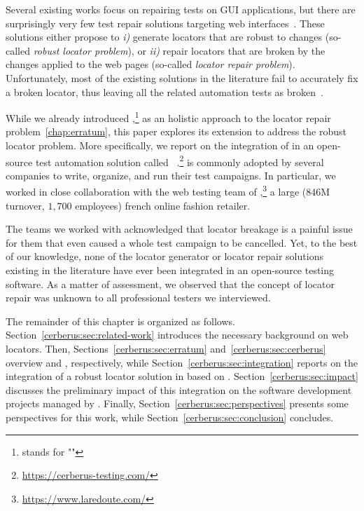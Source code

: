 Several existing works focus on repairing tests on GUI applications, but there are surprisingly very few test repair solutions targeting web interfaces~\cite{imtiaz2019systematic}.
These solutions either propose to \emph{i)} generate locators that are robust to changes (so-called \emph{robust locator problem}), or \emph{ii)} repair locators that are broken by the changes applied to the web pages (so-called \emph{locator repair problem}).
Unfortunately, most of the existing solutions in the literature fail to accurately fix a broken locator, thus leaving all the related automation tests as broken~\cite{hammoudi2016record}.

While we already introduced \erratum{},\footnote{\erratum{} stands for "\erratumlong{}"} as an holistic approach to the locator repair problem~\ref{chap:erratum}, this         paper explores its extension to address the robust locator problem.
More specifically, we report on the integration of \erratum{} in an open-source test automation solution called \cerberus{}~\cite{cerberus-icst20}.\footnote{\url{https://cerberus-testing.com/}}
\cerberus{} is commonly adopted by several companies to write, organize, and run their test campaigns.
In particular, we worked in close collaboration with the web testing team of \laredoute{},\footnote{\url{https://www.laredoute.com/}} a large (846M turnover, $1,700$ employees) french online fashion retailer.

The teams we worked with acknowledged that locator breakage is a painful issue for them that even caused a whole test campaign to be cancelled.
Yet, to the best of our knowledge, none of the locator generator or locator repair solutions existing in the literature have ever been integrated in an open-source testing software.
As a matter of assessment, we observed that the concept of locator repair was unknown to all professional testers we interviewed.


The remainder of this chapter is organized as follows.
Section~\ref{cerberus:sec:related-work} introduces the necessary background on web locators.
% 
Then, Sections~\ref{cerberus:sec:erratum} and~\ref{cerberus:sec:cerberus} overview \erratum and \cerberus, respectively, while Section~\ref{cerberus:sec:integration} reports on the integration of a robust locator solution in \cerberus based on \erratum.
Section~\ref{cerberus:sec:impact} discusses the preliminary impact of this integration on the software development projects managed by \laredoute.
% 
Finally, Section~\ref{cerberus:sec:perspectives} presents some perspectives for this work, while Section~\ref{cerberus:sec:conclusion} concludes.

